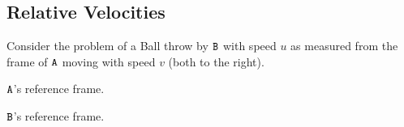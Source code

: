 \documentclass{article}
\begin{document}
\subsection{Relative Velocities}

Consider the problem of a Ball throw by $\texttt{B}$ with speed $u$ as measured from the frame of $\texttt{A}$ moving with speed $v$ (both to the right).

\begin{center}
  \begin{minipage}[b]{0.45\textwidth}
    \begin{center}
    $\texttt{A}$'s reference frame.
    \end{center}
  \end{minipage}
  \begin{minipage}[b]{0.45\textwidth}
    \begin{center}
    $\texttt{B}$'s reference frame.
    \end{center}
  \end{minipage}
\end{center}
\end{document}
